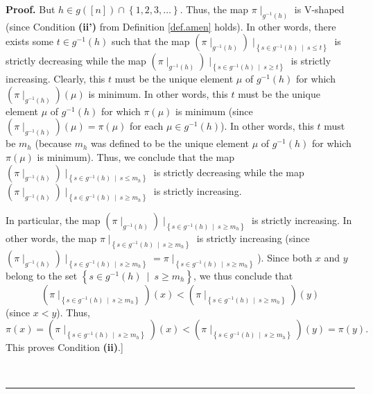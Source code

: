 \documentclass[numbers=enddot,12pt,final,onecolumn,notitlepage]{scrartcl}%
\theoremstyle{definition}
\newenvironment{proof}[1][Proof]{\noindent\textbf{#1.} }{\ \rule{0.5em}{0.5em}}
\newenvironment{verlong}{}{}
\begin{document}
\begin{verlong}
\begin{proof}
But $h\in g\left(  \left[  n\right]  \right)  \cap\left\{  1,2,3,\ldots
\right\}  $. Thus, the map $\pi\mid_{g^{-1}\left(  h\right)  }$ is V-shaped
(since Condition \textbf{(ii')} from Definition \ref{def.amen} holds). In
other words, there exists some $t\in g^{-1}\left(  h\right)  $ such that the
map $\left(  \pi\mid_{g^{-1}\left(  h\right)  }\right)  \mid_{\left\{  s\in
g^{-1}\left(  h\right)  \ \mid\ s\leq t\right\}  }$ is strictly decreasing
while the map $\left(  \pi\mid_{g^{-1}\left(  h\right)  }\right)
\mid_{\left\{  s\in g^{-1}\left(  h\right)  \ \mid\ s\geq t\right\}  }$ is
strictly increasing. Clearly, this $t$ must be the unique element $\mu$ of
$g^{-1}\left(  h\right)  $ for which $\left(  \pi\mid_{g^{-1}\left(  h\right)
}\right)  \left(  \mu\right)  $ is minimum. In other words, this $t$ must be
the unique element $\mu$ of $g^{-1}\left(  h\right)  $ for which $\pi\left(
\mu\right)  $ is minimum (since $\left(  \pi\mid_{g^{-1}\left(  h\right)
}\right)  \left(  \mu\right)  =\pi\left(  \mu\right)  $ for each $\mu\in
g^{-1}\left(  h\right)  $). In other words, this $t$ must be $m_{h}$ (because
$m_{h}$ was defined to be the unique element $\mu$ of $g^{-1}\left(  h\right)
$ for which $\pi\left(  \mu\right)  $ is minimum). Thus, we conclude that the
map $\left(  \pi\mid_{g^{-1}\left(  h\right)  }\right)  \mid_{\left\{  s\in
g^{-1}\left(  h\right)  \ \mid\ s\leq m_{h}\right\}  }$ is strictly decreasing
while the map \newline$\left(  \pi\mid_{g^{-1}\left(  h\right)  }\right)
\mid_{\left\{  s\in g^{-1}\left(  h\right)  \ \mid\ s\geq m_{h}\right\}  }$ is
strictly increasing.

In particular, the map $\left(  \pi\mid_{g^{-1}\left(  h\right)  }\right)
\mid_{\left\{  s\in g^{-1}\left(  h\right)  \ \mid\ s\geq m_{h}\right\}  }$ is
strictly increasing. In other words, the map $\pi\mid_{\left\{  s\in
g^{-1}\left(  h\right)  \ \mid\ s\geq m_{h}\right\}  }$ is strictly increasing
(since \newline$\left(  \pi\mid_{g^{-1}\left(  h\right)  }\right)
\mid_{\left\{  s\in g^{-1}\left(  h\right)  \ \mid\ s\geq m_{h}\right\}  }%
=\pi\mid_{\left\{  s\in g^{-1}\left(  h\right)  \ \mid\ s\geq m_{h}\right\}
}$). Since both $x$ and $y$ belong to the set $\left\{  s\in g^{-1}\left(
h\right)  \ \mid\ s\geq m_{h}\right\}  $, we thus conclude that%
\[
\left(  \pi\mid_{\left\{  s\in g^{-1}\left(  h\right)  \ \mid\ s\geq
m_{h}\right\}  }\right)  \left(  x\right)  <\left(  \pi\mid_{\left\{  s\in
g^{-1}\left(  h\right)  \ \mid\ s\geq m_{h}\right\}  }\right)  \left(
y\right)
\]
(since $x<y$). Thus,%
\[
\pi\left(  x\right)  =\left(  \pi\mid_{\left\{  s\in g^{-1}\left(  h\right)
\ \mid\ s\geq m_{h}\right\}  }\right)  \left(  x\right)  <\left(  \pi
\mid_{\left\{  s\in g^{-1}\left(  h\right)  \ \mid\ s\geq m_{h}\right\}
}\right)  \left(  y\right)  =\pi\left(  y\right)  .
\]
This proves Condition \textbf{(ii)}.]


\end{proof}
\end{verlong}
\end{document}
